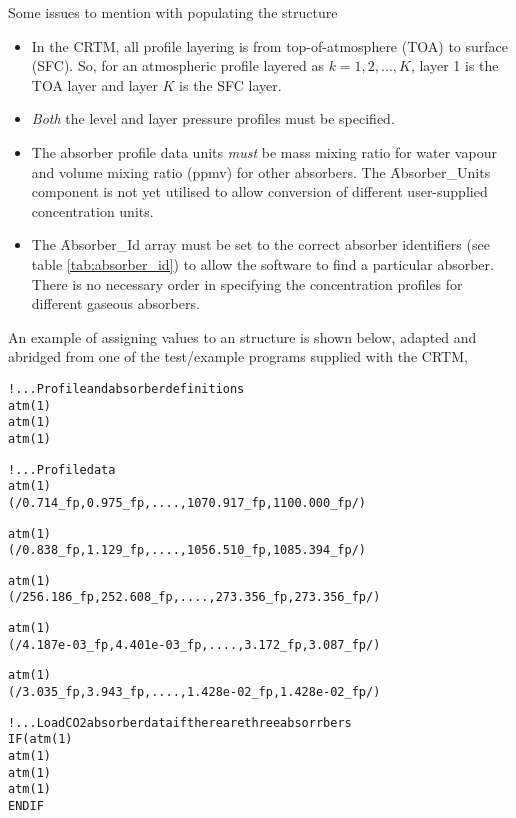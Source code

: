 Some issues to mention with populating the \hyperref[sec:atmosphere_structure]{\Atmosphere} structure

\begin{itemize}
  \item In the CRTM, all profile layering is from top-of-atmosphere (TOA) to surface (SFC). So, for an atmospheric profile layered as $k = 1,2,...,K$, layer 1 is the TOA layer and layer $K$ is the SFC layer.
  \item \emph{Both} the level and layer pressure profiles must be specified.
  \item The absorber profile data units \emph{must} be mass mixing ratio for water vapour and volume mixing ratio (ppmv) for other absorbers. The \f{Absorber\_Units} component is not yet utilised to allow conversion of different user-supplied concentration units.
  \item The \f{Absorber\_Id} array must be set to the correct absorber identifiers (see table \ref{tab:absorber_id}) to allow the software to find a particular absorber. There is no necessary order in specifying the concentration profiles for different gaseous absorbers.
\end{itemize}

An example of assigning values to an \hyperref[sec:atmosphere_structure]{\Atmosphere} structure is shown below, adapted and abridged from one of the test/example programs supplied with the CRTM,

\begin{alltt}
  ! ...Profile and absorber definitions
  atm(1)%\textcolor{red}{Climatology}         = US_STANDARD_ATMOSPHERE
  atm(1)%\textcolor{red}{Absorber_Id(1:2)}    = (/ H2O_ID                 , O3_ID /)
  atm(1)%\textcolor{red}{Absorber_Units(1:2)} = (/ MASS_MIXING_RATIO_UNITS, VOLUME_MIXING_RATIO_UNITS /)

  ! ...Profile data
  atm(1)%\textcolor{red}{Level_Pressure} = &
  (/ 0.714_fp, 0.975_fp, .... , 1070.917_fp, 1100.000_fp /)

  atm(1)%\textcolor{red}{Pressure} = &
  (/ 0.838_fp, 1.129_fp, .... , 1056.510_fp, 1085.394_fp /)

  atm(1)%\textcolor{red}{Temperature} = &
  (/ 256.186_fp, 252.608_fp, .... , 273.356_fp, 273.356_fp /)

  atm(1)%\textcolor{red}{Absorber(:,1)} = &
  (/ 4.187e-03_fp, 4.401e-03_fp, .... , 3.172_fp, 3.087_fp /)

  atm(1)%\textcolor{red}{Absorber(:,2)} = &
  (/ 3.035_fp, 3.943_fp, .... , 1.428e-02_fp, 1.428e-02_fp /)

  ! ...Load CO2 absorber data if there are three absorrbers
  IF ( atm(1)%n_Absorbers > 2 ) THEN
    atm(1)%\textcolor{red}{Absorber_Id(3)}    = CO2_ID
    atm(1)%\textcolor{red}{Absorber_Units(3)} = VOLUME_MIXING_RATIO_UNITS
    atm(1)%\textcolor{red}{Absorber(:,3)}     = 380.0_fp
  END IF\end{alltt}


